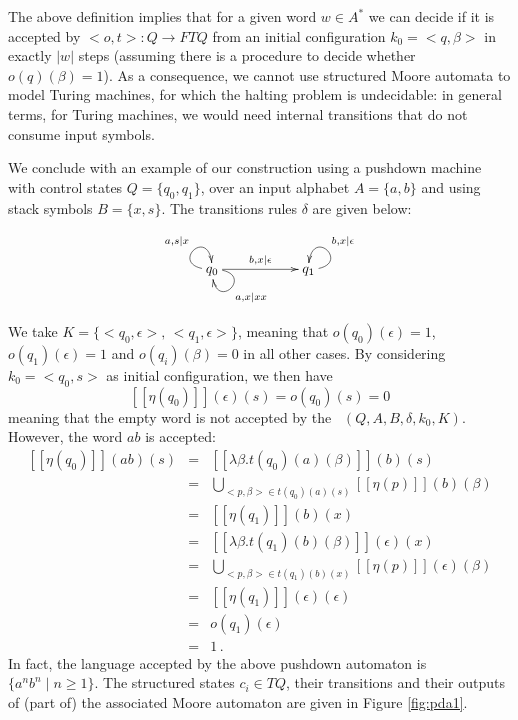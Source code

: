 \documentclass{LMCS}
\newcommand{\bb}[1]{[\![ #1 ]\!]}
\begin{document}
\smallskip

The above definition implies that for a given word $w \in A^*$ we can decide
if it is accepted by $<o,t>\colon Q \to FTQ$ from an initial configuration $k_0 = <q,\beta>$
in exactly $|w|$ steps (assuming there is a procedure to decide whether $o(q)(\beta) = 1$). As a consequence, we cannot
use structured Moore automata to model Turing machines, for which the halting problem is undecidable: in general terms, 
for Turing machines, we would need internal transitions that do not consume input symbols.


\smallskip


We conclude with an example of our construction using a pushdown machine with control states $Q=\{q_0, q_1\}$, over an
input alphabet $A = \{ a,b \}$ and using stack symbols $B = \{ x,s\}$. The transitions rules $\delta$ are given below:
\begin{center}\[
\xymatrix{
q_0 \ar@(l,u)^{a,s|x} \ar@(r,d)^{a,x|xx} \ar[rr]^-{b,x|\epsilon} & & q_1 \ar@(r,u)_{b,x|\epsilon}
}
\]
\end{center}
We take $K=\{<q_0,\epsilon>,\, <q_1,\epsilon>\}$, meaning that $o(q_0)(\epsilon) = 1$, $o(q_1)(\epsilon) = 1$ 
and $o(q_i)(\beta) = 0$ in all other cases. By considering $k_0 = <q_0,s>$ as
initial configuration, we then have
\[
\bb{\eta(q_0)}(\epsilon)(s) = o(q_0)(s) = 0
\]
meaning that the empty word is not accepted by the \pda\ $(Q,A,B,\delta,k_0, K)$. However, the word $ab$ is accepted:
\[
\begin{array}{lcl}
\bb{\eta(q_0)}(ab)(s) & = & \bb{\lambda \beta.t(q_0)(a)(\beta)}(b)(s)\\
                      & = & \bigcup\limits_{<p,\beta> \in t(q_0)(a)(s)} \bb{\eta(p)}(b)(\beta)\\
                      & = & \bb{\eta(q_1)}(b)(x)\\
                      & = &  \bb{\lambda \beta.t(q_1)(b)(\beta)}(\epsilon)(x)\\
                      & = &  \bigcup\limits_{<p,\beta> \in t(q_1)(b)(x)} \bb{\eta(p)}(\epsilon)(\beta)\\
                      & = &  \bb{\eta(q_1)}(\epsilon)(\epsilon)\\
                      & = &  o(q_1)(\epsilon)\\
                      & = &  1 \,.
\end{array}
\]
In fact, the language accepted by the above pushdown automaton is $\{ a^nb^n \mid n \geq 1 \}$. 
The structured states $c_i\in TQ$, their transitions and their outputs of (part of) the associated Moore automaton are given in Figure \ref{fig:pda1}.
\end{document}

